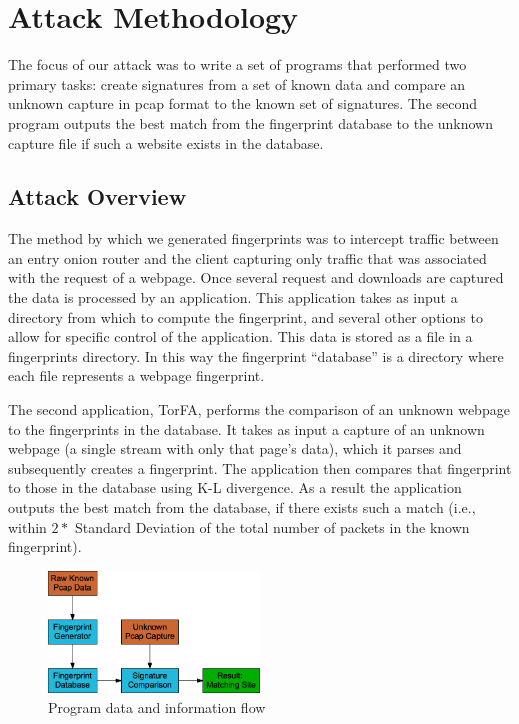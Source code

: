 \documentclass{article}
\begin{document}
\section{Attack Methodology}
The focus of our attack was to write a set of programs that performed 
two primary tasks: create signatures from a set of known data and compare 
an unknown capture in pcap format to the known set of signatures. The 
second program outputs the best match from the fingerprint database to 
the unknown capture file if such a website exists in the database. 

\subsection{Attack Overview}
The method by which we generated fingerprints was to intercept traffic 
between an entry onion router and the client capturing only traffic that was associated
with the request of a webpage. Once several request and downloads are 
captured the data is processed by an application. This application takes 
as input a directory from which to compute the fingerprint, and several 
other options to allow for specific control of the application. This data
is stored as a file in a fingerprints directory. In this way the fingerprint
``database'' is a directory where each file represents a webpage fingerprint. 

The second application, TorFA, performs the comparison of an unknown webpage 
to the fingerprints in the database. It takes as input a capture of an unknown
webpage (a single stream with only that page's data), which it parses and 
subsequently creates a fingerprint. The application then compares that 
fingerprint to those in the database using K-L divergence. As a result the 
application outputs the best match from the database, if there exists such a match 
(i.e., within $2 *$ Standard Deviation of the total number of packets in the 
known fingerprint). 

\begin{figure}
	\centering
		\includegraphics[width=0.5\textwidth]{programFlow.png}
	\caption{Program data and information flow}
	\label{fig:programFlow}
\end{figure}
\end{document}
